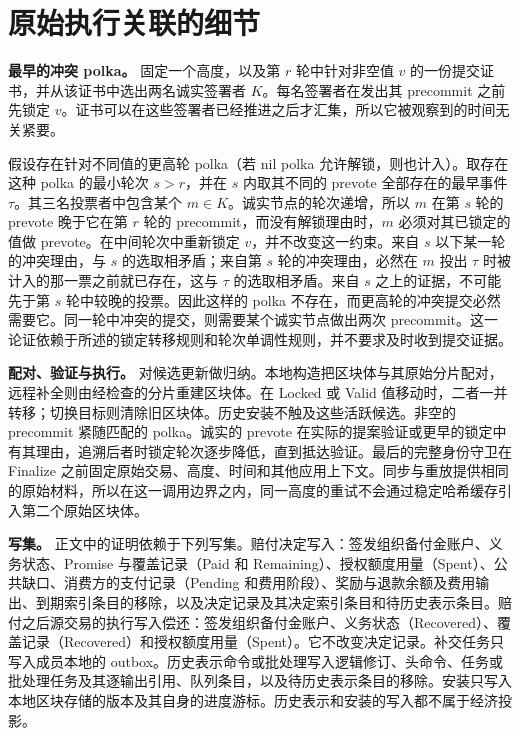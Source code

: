 \section{原始执行关联的细节}
\label{supp:original-execution}

\noindent\textbf{最早的冲突 polka。}
固定一个高度，以及第 $r$ 轮中针对非空值 $v$ 的一份提交证书，并从该证书中选出两名诚实签署者 $K$。每名签署者在发出其 precommit 之前先锁定 $v$。证书可以在这些签署者已经推进之后才汇集，所以它被观察到的时间无关紧要。

假设存在针对不同值的更高轮 polka（若 nil polka 允许解锁，则也计入）。取存在这种 polka 的最小轮次 $s>r$，并在 $s$ 内取其不同的 prevote 全部存在的最早事件 $\tau$。其三名投票者中包含某个 $m\in K$。诚实节点的轮次递增，所以 $m$ 在第 $s$ 轮的 prevote 晚于它在第 $r$ 轮的 precommit，而没有解锁理由时，$m$ 必须对其已锁定的值做 prevote。在中间轮次中重新锁定 $v$，并不改变这一约束。来自 $s$ 以下某一轮的冲突理由，与 $s$ 的选取相矛盾；来自第 $s$ 轮的冲突理由，必然在 $m$ 投出 $\tau$ 时被计入的那一票之前就已存在，这与 $\tau$ 的选取相矛盾。来自 $s$ 之上的证据，不可能先于第 $s$ 轮中较晚的投票。因此这样的 polka 不存在，而更高轮的冲突提交必然需要它。同一轮中冲突的提交，则需要某个诚实节点做出两次 precommit。这一论证依赖于所述的锁定转移规则和轮次单调性规则，并不要求及时收到提交证据。

\noindent\textbf{配对、验证与执行。}
对候选更新做归纳。本地构造把区块体与其原始分片配对，远程补全则由经检查的分片重建区块体。在 Locked 或 Valid 值移动时，二者一并转移；切换目标则清除旧区块体。历史安装不触及这些活跃候选。非空的 precommit 紧随匹配的 polka。诚实的 prevote 在实际的提案验证或更早的锁定中有其理由，追溯后者时锁定轮次逐步降低，直到抵达验证。最后的完整身份守卫在 Finalize 之前固定原始交易、高度、时间和其他应用上下文。同步与重放提供相同的原始材料，所以在这一调用边界之内，同一高度的重试不会通过稳定哈希缓存引入第二个原始区块体。

\noindent\textbf{写集。}
正文中的证明依赖于下列写集。赔付决定写入：签发组织备付金账户、义务状态、Promise 与覆盖记录（Paid 和 Remaining）、授权额度用量（Spent）、公共缺口、消费方的支付记录（Pending 和费用阶段）、奖励与退款余额及费用输出、到期索引条目的移除，以及决定记录及其决定索引条目和待历史表示条目。赔付之后源交易的执行写入偿还：签发组织备付金账户、义务状态（Recovered）、覆盖记录（Recovered）和授权额度用量（Spent）。它不改变决定记录。补交任务只写入成员本地的 outbox。历史表示命令或批处理写入逻辑修订、头命令、任务或批处理任务及其逐输出引用、队列条目，以及待历史表示条目的移除。安装只写入本地区块存储的版本及其自身的进度游标。历史表示和安装的写入都不属于经济投影。

